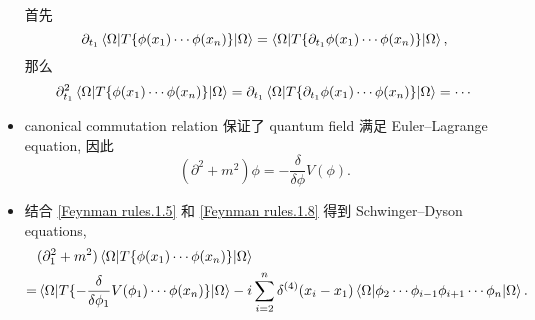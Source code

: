 \begin{itemize}
	\begin{tcolorbox}[title=proof:]
		首先
		\begin{equation}
			\partial_{t_1} \braket{\Omega | T\{\phi(x_1) \cdots \phi(x_n)\} | \Omega} = \braket{\Omega | T\{\partial_{t_1} \phi(x_1) \cdots \phi(x_n)\} | \Omega},
		\end{equation}
		那么
		\begin{equation}
			\partial_{t_1}^2 \braket{\Omega | T\{\phi(x_1) \cdots \phi(x_n)\} | \Omega} = \partial_{t_1} \braket{\Omega | T\{\partial_{t_1} \phi(x_1) \cdots \phi(x_n)\} | \Omega} = \cdots 
		\end{equation}
	\end{tcolorbox}
	
	\item canonical commutation relation 保证了 quantum field 满足 Euler--Lagrange equation, 因此
	\begin{equation} \label{Feynman rules.1.8}
		(\partial^2 + m^2) \phi = - \frac{\delta}{\delta \phi} V(\phi).
	\end{equation}
	
	\item 结合 \eqref{Feynman rules.1.5} 和 \eqref{Feynman rules.1.8} 得到 Schwinger--Dyson equations,
	\begin{align}
		& (\partial_1^2 + m^2) \braket{\Omega | T\{\phi(x_1) \cdots \phi(x_n)\} | \Omega} \notag \\
		=& \braket{\Omega | T\{- \frac{\delta}{\delta \phi_1} V(\phi_1) \cdots \phi(x_n)\} | \Omega} - i \sum_{i = 2}^n \delta^{(4)}(x_i - x_1) \braket{\Omega | \phi_2 \cdots \phi_{i - 1} \phi_{i + 1} \cdots \phi_n | \Omega}.
	\end{align}
\end{itemize}

